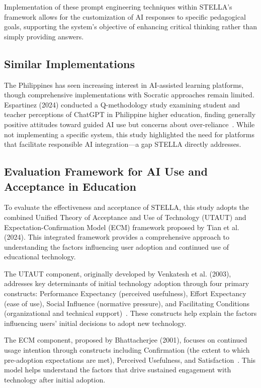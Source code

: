 \documentclass[sigconf,natbib=true]{acmart}
\begin{document}
Implementation of these prompt engineering techniques within STELLA's framework allows for the customization of AI responses to specific pedagogical goals, supporting the system's objective of enhancing critical thinking rather than simply providing answers.

\subsection{Similar Implementations}
The Philippines has seen increasing interest in AI-assisted learning platforms, though comprehensive implementations with Socratic approaches remain limited. Espartinez (2024) conducted a Q-methodology study examining student and teacher perceptions of ChatGPT in Philippine higher education, finding generally positive attitudes toward guided AI use but concerns about over-reliance~\cite{espartinezExploringStudentTeacher2024}. While not implementing a specific system, this study highlighted the need for platforms that facilitate responsible AI integration—a gap STELLA directly addresses.

\subsection{Evaluation Framework for AI Use and Acceptance in Education}
To evaluate the effectiveness and acceptance of STELLA, this study adopts the combined Unified Theory of Acceptance and Use of Technology (UTAUT) and Expectation-Confirmation Model (ECM) framework proposed by Tian et al. (2024). This integrated framework provides a comprehensive approach to understanding the factors influencing user adoption and continued use of educational technology.

The UTAUT component, originally developed by Venkatesh et al. (2003), addresses key determinants of initial technology adoption through four primary constructs: Performance Expectancy (perceived usefulness), Effort Expectancy (ease of use), Social Influence (normative pressure), and Facilitating Conditions (organizational and technical support)~\cite{venkateshUserAcceptanceInformation2003}. These constructs help explain the factors influencing users' initial decisions to adopt new technology.

The ECM component, proposed by Bhattacherjee (2001), focuses on continued usage intention through constructs including Confirmation (the extent to which pre-adoption expectations are met), Perceived Usefulness, and Satisfaction~\cite{bhattacherjeeUnderstandingInformationSystems2001}. This model helps understand the factors that drive sustained engagement with technology after initial adoption.
\end{document}

